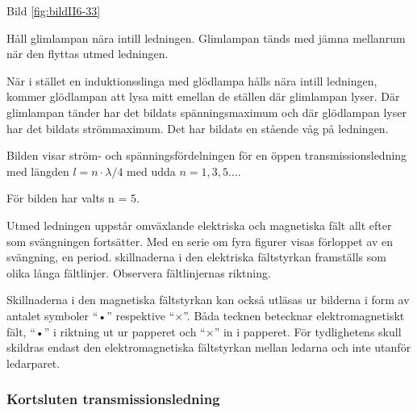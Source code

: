 Bild \ref{fig:bildII6-33}

Håll glimlampan nära intill ledningen.  Glimlampan tänds med jämna
mellanrum när den flyttas utmed ledningen.

När i stället en induktionsslinga med glödlampa hålls nära intill
ledningen, kommer glödlampan att lysa mitt emellan de ställen där
glimlampan lyser. Där glimlampan tänder har det bildats
spänningsmaximum och där glödlampan lyser har det bildats
strömmaximum. Det har bildats en stående våg på ledningen.

Bilden visar ström- och spänningsfördelningen för en öppen
transmissionsledning med längden \(l = n\cdot\lambda/4\) med udda \(n
= 1, 3, 5 \dots\).

För bilden har valts n = 5.

Utmed ledningen uppstår omväxlande elektriska och magnetiska fält allt
efter som svängningen fortsätter. Med en serie om fyra figurer visas
förloppet av en svängning, en period. skillnaderna i den elektriska
fältstyrkan framställs som olika långa fältlinjer.  Observera
fältlinjernas riktning.

Skillnaderna i den magnetiska fältstyrkan kan också utläsas ur
bilderna i form av antalet symboler ``•'' respektive
``\(\times\)''. Båda tecknen betecknar elektromagnetiskt fält, ``•'' i
riktning ut ur papperet och ``\(\times\)'' in i papperet. För
tydlighetens skull skildras endast den elektromagnetiska fältstyrkan
mellan ledarna och inte utanför ledarparet.

\subsubsection{Kortsluten transmissionsledning}


